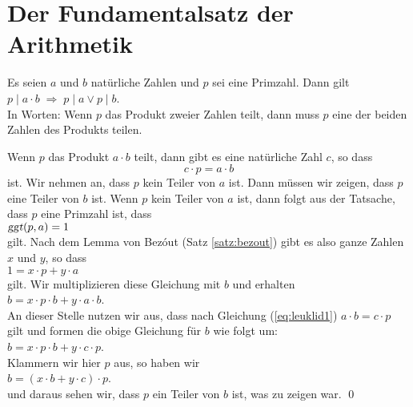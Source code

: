 \section{Der Fundamentalsatz der Arithmetik}
\begin{Satz} \lb
Es seien $a$ und $b$ nat\"{u}rliche Zahlen und $p$ sei eine Primzahl.  Dann gilt
\\[0.2cm]
\hspace*{1.3cm}
$p \mid a \cdot b \;\Rightarrow\; p \mid a  \vee p \mid b$.
\\[0.2cm]
In Worten: Wenn $p$ das Produkt zweier Zahlen teilt, dann muss $p$ eine der beiden Zahlen
des Produkts teilen.  
\end{Satz}

\proof
Wenn $p$ das Produkt $a \cdot b$ teilt, dann gibt es eine nat\"{u}rliche Zahl $c$, so dass
\begin{equation}
  \label{eq:leuklid1}
  c \cdot p = a \cdot b
\end{equation}
ist.  Wir nehmen an, dass $p$ kein Teiler von $a$ ist.  Dann m\"{u}ssen wir zeigen, dass $p$ eine
Teiler von $b$ ist.  Wenn $p$ kein Teiler von $a$ ist, dann folgt aus der Tatsache, dass
$p$ eine Primzahl ist, dass
\\[0.2cm]
\hspace*{1.3cm}
$\textsl{ggt}(p, a) = 1$
\\[0.2cm]
gilt.  Nach dem Lemma von Bez\'out (Satz \ref{satz:bezout}) gibt es also ganze Zahlen $x$
und $y$, so dass 
\\[0.2cm]
\hspace*{1.3cm}
$1 = x \cdot p + y \cdot a$
\\[0.2cm]
gilt.  Wir multiplizieren diese Gleichung mit $b$ und erhalten
\\[0.2cm]
\hspace*{1.3cm}
$b = x \cdot p \cdot b + y \cdot a \cdot b$.
\\[0.2cm]
An dieser Stelle nutzen wir aus, dass nach Gleichung (\ref{eq:leuklid1}) 
$a \cdot b = c \cdot p$ gilt und formen die obige Gleichung f\"{u}r $b$ wie folgt um:
\\[0.2cm]
\hspace*{1.3cm}
$b = x \cdot p \cdot b + y \cdot c \cdot p$.
\\[0.2cm]
Klammern wir hier $p$ aus, so haben wir
\\[0.2cm]
\hspace*{1.3cm}
$b = (x \cdot b + y \cdot c) \cdot p$.
\\[0.2cm]
und daraus sehen wir, dass $p$ ein Teiler von $b$ ist, was zu zeigen war. \qed
\vspace*{0.3cm}

